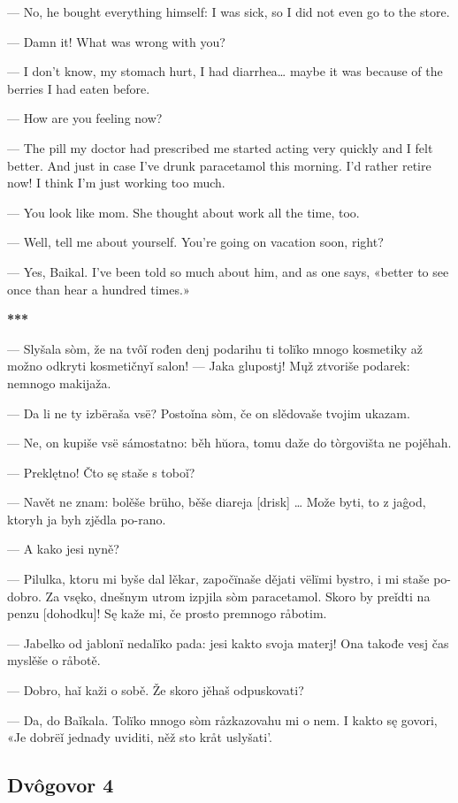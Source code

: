— No, he bought everything himself: I was sick, so I did not even go to the store.

— Damn it! What was wrong with you?

— I don’t know, my stomach hurt, I had diarrhea… maybe it was because of the berries I had eaten before.

— How are you feeling now?

— The pill my doctor had prescribed me started acting very quickly and I felt better. And just in case I’ve drunk paracetamol this morning. I’d rather retire now! I think I’m just working too much.

— You look like mom. She thought about work all the time, too.

— Well, tell me about yourself. You’re going on vacation soon, right?

— Yes, Baikal. I’ve been told so much about him, and as one says, «better to see once than hear a hundred times.»

\begin{center}
	\textbf{***}
\end{center}

— Slyšala sòm, že na tvôǐ rođen denj podarihu ti tolïko mnogo kosmetiky až možno odkryti kosmetičnyǐ salon!
— Jaka glupostj! Mųž ztvoriše podarek: nemnogo makijaža.

— Da li ne ty izbëraša vsë? Postoǐna sòm, če on slědovaše tvojim ukazam.

— Ne, on kupiše vsë sámostatno: běh hŭora, tomu daže do tòrgovišta ne pojěhah.

— Preklętno! Čto sę staše s toboǐ?

— Navět ne znam: bolěše brüho, běše diareja [drisk] … Može byti, to z jaĝod, ktoryh ja byh zjědla po-rano.

— A kako jesi nyně?

— Pilulka, ktoru mi byše dal lěkar, započïnaše dějati vëlïmi bystro, i mi staše po-dobro. Za vsęko, dnešnym utrom izpjila sòm paracetamol. Skoro by preǐdti na penzu [dohodku]! Sę kaže mi, če prosto premnogo råbotim.

— Jabelko od jablonï nedalïko pada: jesi kakto svoja materj! Ona takođe vesj čas myslěše o råbotě.

— Dobro, haǐ kaži o sobě. Že skoro jěhaš odpuskovati?

— Da, do Baǐkala. Tolïko mnogo sòm råzkazovahu mi o nem. I kakto sę govori, «Je dobrëǐ jednađy uviditi, něž sto kråt uslyšati’.


\subsection{Dvôgovor 4}

